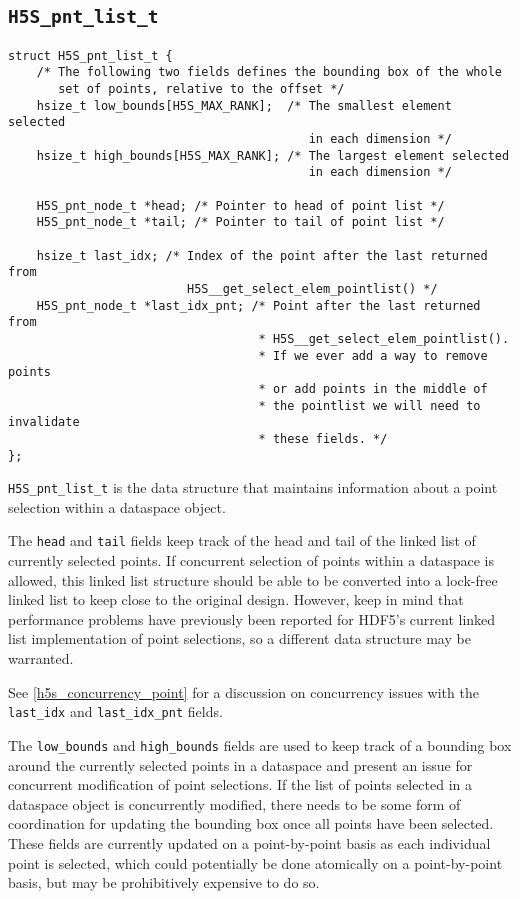\documentclass[../HDF5_RFC.tex]{subfiles}
\begin{document}
\subsection{\texttt{H5S\_pnt\_list\_t}}
\label{apdx:h5s_struct_h5s_pnt_list_t}

\begin{verbatim}
struct H5S_pnt_list_t {
    /* The following two fields defines the bounding box of the whole
       set of points, relative to the offset */
    hsize_t low_bounds[H5S_MAX_RANK];  /* The smallest element selected
                                          in each dimension */
    hsize_t high_bounds[H5S_MAX_RANK]; /* The largest element selected
                                          in each dimension */

    H5S_pnt_node_t *head; /* Pointer to head of point list */
    H5S_pnt_node_t *tail; /* Pointer to tail of point list */

    hsize_t last_idx; /* Index of the point after the last returned from
                         H5S__get_select_elem_pointlist() */
    H5S_pnt_node_t *last_idx_pnt; /* Point after the last returned from
                                   * H5S__get_select_elem_pointlist().
                                   * If we ever add a way to remove points
                                   * or add points in the middle of
                                   * the pointlist we will need to invalidate
                                   * these fields. */
};
\end{verbatim}

\texttt{H5S\_pnt\_list\_t} is the data structure that maintains information about a point
selection within a dataspace object.

The \texttt{head} and \texttt{tail} fields keep track of the head and tail of the linked
list of currently selected points. If concurrent selection of points within a dataspace
is allowed, this linked list structure should be able to be converted into a lock-free
linked list to keep close to the original design. However, keep in mind that performance
problems have previously been reported for HDF5's current linked list implementation of
point selections, so a different data structure may be warranted.

See \ref{h5s_concurrency_point} for a discussion on concurrency issues with the
\texttt{last\_idx} and \texttt{last\_idx\_pnt} fields.

The \texttt{low\_bounds} and \texttt{high\_bounds} fields are used to keep track of a bounding
box around the currently selected points in a dataspace and present an issue for concurrent
modification of point selections. If the list of points selected in a dataspace object is
concurrently modified, there needs to be some form of coordination for updating the bounding
box once all points have been selected. These fields are currently updated on a point-by-point
basis as each individual point is selected, which could potentially be done atomically on a
point-by-point basis, but may be prohibitively expensive to do so.
\end{document}
